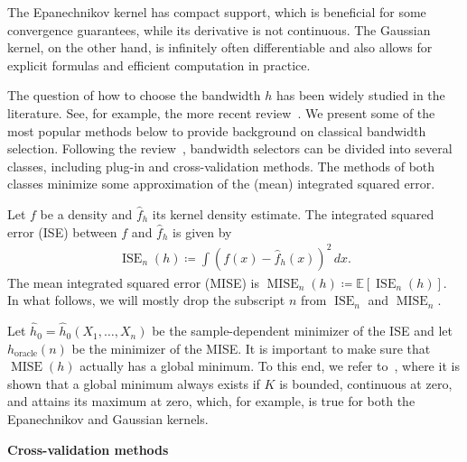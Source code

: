 The Epanechnikov kernel has compact support, which is beneficial for some convergence guarantees, while its derivative is not continuous. The Gaussian kernel, on the other hand, is infinitely often differentiable and also allows for explicit formulas and efficient computation in practice.

The question of how to choose the bandwidth $h$ has been widely studied in the literature. See, for example, the more recent review~\cite{heidenreich_bandwidth_2013}. We present some of the most popular methods below to provide background on classical bandwidth selection. Following the review~\cite{heidenreich_bandwidth_2013}, bandwidth selectors can be divided into several classes, including plug-in and cross-validation methods. The methods of both classes minimize some approximation of the (mean) integrated squared error.

\begin{Def}
    Let $f$ be a density and $\hat{f}_h$ its kernel density estimate. The integrated squared error (ISE) between $f$ and $\hat{f}_h$ is given by
    \begin{align*}
        \operatorname{ISE}_n(h)\coloneqq \int\left(f(x)-\hat{f}_h(x)\right)^2\,dx.
    \end{align*}
    The mean integrated squared error (MISE) is $\operatorname{MISE}_n(h)\coloneqq\mathbb{E}[\operatorname{ISE}_n(h)]$. In what follows, we will mostly drop the subscript $n$ from $\operatorname{ISE}_n$ and $\operatorname{MISE}_n$.
\end{Def}

Let $\hat{h}_0=\hat{h}_0(X_1,\dots,X_n)$ be the sample-dependent minimizer of the ISE and let $h_{\text{oracle}}(n)$ be the minimizer of the MISE. It is important to make sure that $\operatorname{MISE}(h)$ actually has a global minimum. To this end, we refer to~\cite[Theorem~1]{chacon_existence_nodate}, where it is shown that a global minimum always exists if $K$ is bounded, continuous at zero, and attains its maximum at zero, which, for example, is true for both the Epanechnikov and Gaussian kernels.

\textbf{Cross-validation methods}

